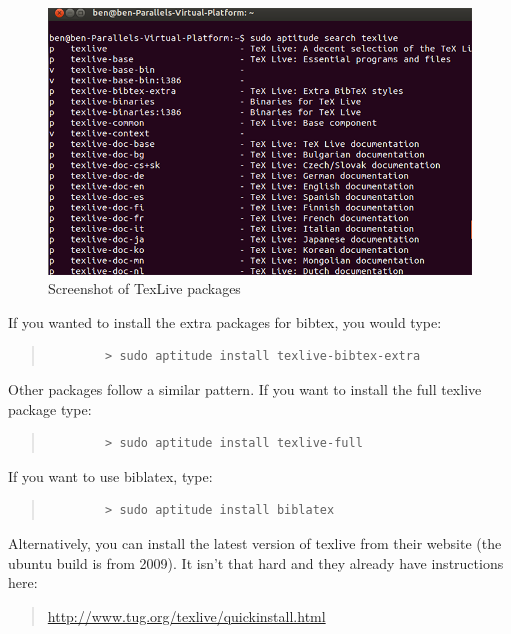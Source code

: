 \documentclass[11pt]{article}
\begin{document}
\begin{figure}[!h]
	\centering
	\includegraphics[width=5in]{graphics/ShowTexLivePackages.png}
	\caption{Screenshot of TexLive packages}
	\label{fig:texlive}
\end{figure}

If you wanted to install the extra packages for bibtex, you would type:

\begin{quote}
	\begin{verbatim}
		> sudo aptitude install texlive-bibtex-extra
	\end{verbatim}
\end{quote}

Other packages follow a similar pattern.  If you want to install the full texlive package type:

\begin{quote}
	\begin{verbatim}
		> sudo aptitude install texlive-full
	\end{verbatim}
\end{quote}

If you want to use biblatex, type:

\begin{quote}
	\begin{verbatim}
		> sudo aptitude install biblatex
	\end{verbatim}
\end{quote}

Alternatively, you can install the latest version of texlive from their website (the ubuntu build is from 2009).  It isn't that hard and they already have instructions here: 

\begin{quote}
	\href{http://www.tug.org/texlive/quickinstall.html}{http:/\slash www.tug.org\slash texlive\slash quickinstall.html}
\end{quote}
\end{document}
